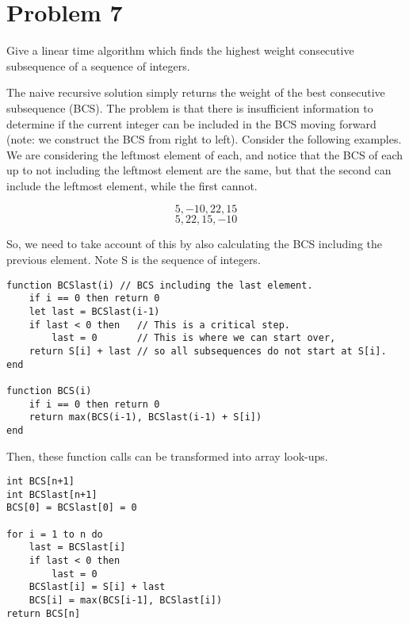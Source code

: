 \documentclass{article}
\providecommand{\prob}[1]{\section*{Problem #1}}
\begin{document}
    \pagebreak
    \prob{7}
    Give a linear time algorithm which finds the highest weight consecutive subsequence of a sequence of integers.
    
    The naive recursive solution simply returns the weight of the best consecutive subsequence (BCS).
    The problem is that there is insufficient information to determine if the current integer can be included in the BCS moving forward (note: we construct the BCS from right to left).
    Consider the following examples. We are considering the leftmost element of each, and notice that the BCS of each up to not including the leftmost element are the same, but that the second can include the leftmost element, while the first cannot.
    
    \[5, -10, 22, 15 \]
    \[5, 22, 15, -10 \]
    
    So, we need to take account of this by also calculating the BCS including the previous element. Note S is the sequence of integers.
    
    \begin{lstlisting}
function BCSlast(i) // BCS including the last element.
    if i == 0 then return 0
    let last = BCSlast(i-1)
    if last < 0 then   // This is a critical step.
        last = 0       // This is where we can start over,
    return S[i] + last // so all subsequences do not start at S[i].
end
    
function BCS(i)
    if i == 0 then return 0
    return max(BCS(i-1), BCSlast(i-1) + S[i])
end
    \end{lstlisting}
    
    Then, these function calls can be transformed into array look-ups.
    
    \begin{lstlisting}
int BCS[n+1]
int BCSlast[n+1]
BCS[0] = BCSlast[0] = 0

for i = 1 to n do
    last = BCSlast[i]
    if last < 0 then
        last = 0
    BCSlast[i] = S[i] + last
    BCS[i] = max(BCS[i-1], BCSlast[i])
return BCS[n]
    \end{lstlisting}
\end{document}
